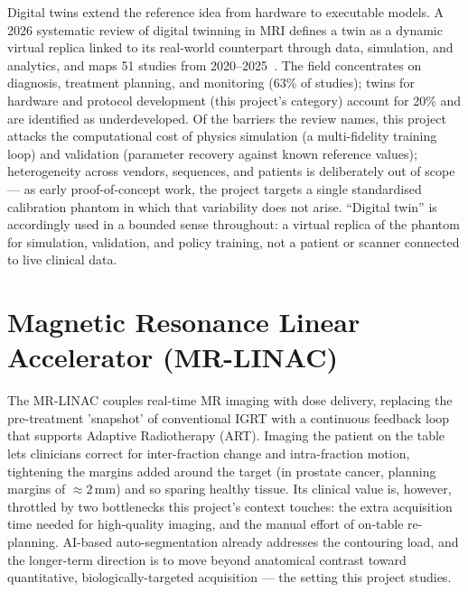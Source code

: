 Digital twins extend the reference idea from hardware to executable models. A
2026 systematic review of digital twinning in MRI defines a twin as a dynamic
virtual replica linked to its real-world counterpart through data,
simulation, and analytics, and maps 51 studies from
2020--2025~\cite{greggio_digital_twinning_mri_2026}. The field concentrates
on diagnosis, treatment planning, and monitoring (63\% of studies); twins for
hardware and protocol development (this project's category) account for 20\%
and are identified as underdeveloped. Of the barriers the review names, this
project attacks the computational cost of physics simulation (a
multi-fidelity training loop) and validation (parameter recovery against
known reference values); heterogeneity across vendors, sequences, and
patients is deliberately out of scope --- as early proof-of-concept work, the
project targets a single standardised calibration phantom in which that
variability does not arise. ``Digital twin'' is accordingly used in a bounded
sense throughout: a virtual replica of the phantom for simulation,
validation, and policy training, not a patient or scanner connected to live
clinical data.

\section{Magnetic Resonance Linear Accelerator (MR-LINAC)}

The MR-LINAC couples real-time MR imaging with dose delivery, replacing the
pre-treatment 'snapshot' of conventional IGRT with a continuous feedback loop
that supports Adaptive Radiotherapy (ART). Imaging the patient on the table
lets clinicians correct for inter-fraction change and intra-fraction motion,
tightening the margins added around the target (in prostate cancer, planning
margins of ${\approx}2$\,mm) and so sparing healthy tissue\cite{ocanto_mr-linac:2024}.
Its clinical value is, however, throttled by two bottlenecks this project's
context touches: the extra acquisition time needed for high-quality imaging,
and the manual effort of on-table re-planning\cite{mrlinac_in_practice:23}.
AI-based auto-segmentation already addresses the contouring
load\cite{phillip_mri_seg:2020}, and the longer-term direction is to move
beyond anatomical contrast toward quantitative, biologically-targeted
acquisition --- the setting this project studies.


